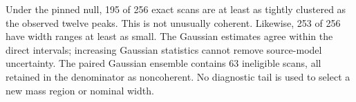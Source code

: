 Under the pinned null, 195 of 256 exact scans are at least as tightly clustered as the observed twelve peaks. This is not unusually coherent. Likewise, 253 of 256 have width ranges at least as small. The Gaussian estimates agree within the direct intervals; increasing Gaussian statistics cannot remove source-model uncertainty. The paired Gaussian ensemble contains 63 ineligible scans, all retained in the denominator as noncoherent. No diagnostic tail is used to select a new mass region or nominal width.
